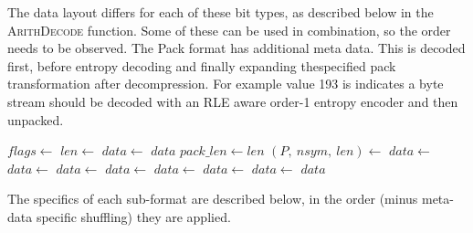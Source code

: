 \documentclass[a4paper]{article}
\begin{document}
The data layout differs for each of these bit types, as described below in the \textsc{ArithDecode} function.
Some of these can be used in combination, so the order needs to be observed.
The Pack format has additional meta data.
This is decoded first, before entropy decoding and finally expanding thespecified pack transformation after decompression.
For example value 193 is indicates a byte stream should be decoded with an RLE aware order-1 entropy encoder and then unpacked.

\begin{algorithmic}[1]
  \State $flags \gets $
    \State $len \gets$
  \EndIf
    \State $data \gets $
    \State \Return $data$
  \EndIf{}
    \State $pack\_len \gets len$
    \State $(P,\ nsym,\ len) \gets $
  \EndIf
  \Statex {}
    \State $data \gets $
    \State $data \gets $
      \State $data \gets $
    \Else
      \State $data \gets $
    \EndIf
  \Else
      \State $data \gets $
    \Else
      \State $data \gets $
    \EndIf
  \EndIf
  \Statex {}
    \State $data \gets $
  \EndIf
  \State \Return $data$
  \EndFunction
\end{algorithmic}

The specifics of each sub-format are described below, in the order (minus meta-data specific shuffling) they are applied.
\end{document}
